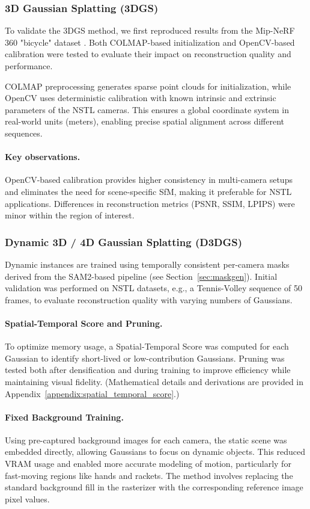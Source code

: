 \subsubsection{3D Gaussian Splatting (3DGS)}
To validate the 3DGS method, we first reproduced results from the Mip-NeRF 360 "bicycle" dataset \cite{barron2021mip}. Both COLMAP-based initialization and OpenCV-based calibration were tested to evaluate their impact on reconstruction quality and performance.

COLMAP preprocessing generates sparse point clouds for initialization, while OpenCV uses deterministic calibration with known intrinsic and extrinsic parameters of the NSTL cameras. 
This ensures a global coordinate system in real-world units (meters), enabling precise spatial alignment across different sequences.

\paragraph{Key observations.} 
OpenCV-based calibration provides higher consistency in multi-camera setups and eliminates the need for scene-specific SfM, making it preferable for NSTL applications. Differences in reconstruction metrics (PSNR, SSIM, LPIPS) were minor within the region of interest.

\subsubsection{Dynamic 3D / 4D Gaussian Splatting (D3DGS)}
Dynamic instances are trained using temporally consistent per-camera masks derived from the SAM2-based pipeline (see Section~\ref{sec:maskgen}). 
Initial validation was performed on NSTL datasets, e.g., a Tennis-Volley sequence of 50 frames, to evaluate reconstruction quality with varying numbers of Gaussians.

\paragraph{Spatial-Temporal Score and Pruning.} 
To optimize memory usage, a Spatial-Temporal Score was computed for each Gaussian to identify short-lived or low-contribution Gaussians. Pruning was tested both after densification and during training to improve efficiency while maintaining visual fidelity. (Mathematical details and derivations are provided in Appendix~\ref{appendix:spatial_temporal_score}.)

\paragraph{Fixed Background Training.} 
Using pre-captured background images for each camera, the static scene was embedded directly, allowing Gaussians to focus on dynamic objects. 
This reduced VRAM usage and enabled more accurate modeling of motion, particularly for fast-moving regions like hands and rackets. 
The method involves replacing the standard background fill in the rasterizer with the corresponding reference image pixel values.

